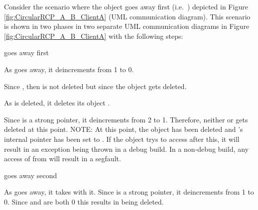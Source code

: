 \documentclass[pdf,ps2pdf,11pt]{SANDreport}
\begin{document}
Consider the scenario where the {} object goes away first
(i.e.\ {}) depicted in Figure
{}\ref{fig:CircularRCP_A_B_ClientA} (UML communication diagram).  This
scenario is shown in two phases in two separate UML communication
diagrams in Figure {}\ref{fig:CircularRCP_A_B_ClientA} with the
following steps:

\begin{description}

{}\item[a)] {} goes away first

  \begin{description}

  {}\item[a.1)] As {} goes away, it deincrements
  {} from 1 to 0.

  {}\item[a.2)] Since {}, then
  {} is not deleted but since
  {} the object {} gets
  deleted.

  {}\item[a.3)] As {} is deleted, it deletes its
  {} object {}.

  {}\item[a.4)] Since {} is a strong pointer, it
  deincrements {} from 2 to 1.  Therefore,
  neither {} or {} gets deleted at this point.
  NOTE: At this point, the object {} has been deleted and
  {}'s internal pointer has been set to {}.  If
  the {} object trys to access {} after this, it will
  result in an exception being thrown in a debug build.  In a
  non-debug build, any access of {} from {} will result
  in a segfault.

  \end{description}

{}\item[b)] {} goes away second

  \begin{description}

  {}\item[b.1)] As {} goes away, it takes {}
  with it.  Since {} is a strong pointer, it deincrements
  {} from 1 to 0.  Since
  {} and {} are both 0
  this results in {} being deleted.


\end{description}
\end{description}
\end{document}
